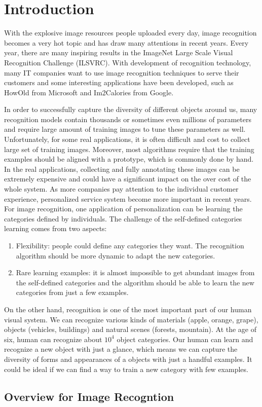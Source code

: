 \chapter{Introduction}
With the explosive image resources people uploaded every day, image recognition becomes a very hot topic and has draw many attentions in recent years. Every year, there are many inspiring results in the ImageNet Large Scale Visual Recognition Challenge (ILSVRC). 
With development of recognition technology, many IT companies want to use image recognition techniques to serve their customers and some interesting applications have been developed, such as HowOld from Microsoft and Im2Calories from Google.

In order to successfully capture the diversity of different objects around us, many recognition models contain thousands or sometimes even millions of parameters and require large amount of training images to tune these parameters as well.
Unfortunately, for some real applications, it is often difficult and cost to collect large set of training images. Moreover, most algorithms require that the training examples should be aligned with a prototype, which is commonly done by hand. In the real applications, collecting and fully annotating these images can be extremely expensive and could have a significant impact on the over cost of the whole system. As more companies pay attention to the individual customer experience, personalized service system become more important in recent years. For image recognition, one application of personalization can be learning the categories defined by individuals. The challenge of the self-defined categories learning comes from two aspects:
\begin{enumerate}
	\item Flexibility: people could define any categories they want. The recognition algorithm should be more dynamic to adapt the new categories.
	\item Rare learning examples: it is almost impossible to get abundant images from the self-defined categories and the algorithm should be able to learn the new categories from just a few examples.
\end{enumerate} 

On the other hand, recognition is one of the most important part of our human visual system. We can recognize various kinds of materials (apple, orange, grape), objects (vehicles, buildings) and natural scenes (forests, mountain). At the age of six, human can recognize about $10^4$ object categories\cite{biederman1987recognition}. 
Our human can learn and recognize a new object with just a glance, which means we can capture the diversity of forms and appearances of a objects with just a handful examples. It could be ideal if we can find a way to train a new category with few examples.
\section{Overview for Image Recogntion}
